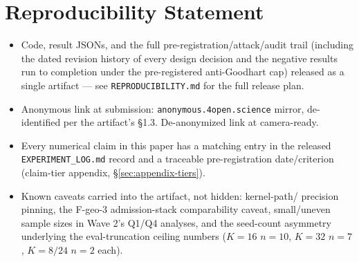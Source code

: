 \section{Reproducibility Statement}
\label{sec:reproducibility}


\begin{itemize}
  \item Code, result JSONs, and the full pre-registration/attack/audit
    trail (including the dated revision history of every design decision
    and the negative results run to completion under the pre-registered
    anti-Goodhart cap) released as a single artifact --- see
    \texttt{REPRODUCIBILITY.md} for the full release plan.
  \item Anonymous link at submission: \texttt{anonymous.4open.science}
    mirror, de-identified per the artifact's \S1.3. De-anonymized link at
    camera-ready.
  \item Every numerical claim in this paper has a matching entry in the
    released \texttt{EXPERIMENT\_LOG.md} record and a traceable
    pre-registration date/criterion (claim-tier appendix,
    \S\ref{sec:appendix-tiers}).
  \item Known caveats carried into the artifact, not hidden: kernel-path/
    precision pinning, the F-geo-3 admission-stack comparability caveat,
    small/uneven sample sizes in Wave 2's Q1/Q4 analyses, and the
    seed-count asymmetry underlying the eval-truncation ceiling numbers
    ($K{=}16$ $n{=}10$, $K{=}32$ $n{=}7$, $K{=}8/24$ $n{=}2$ each).
\end{itemize}
